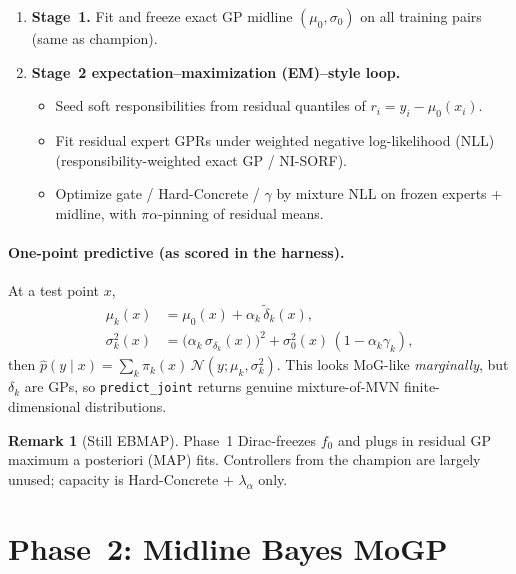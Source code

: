 \documentclass[11pt,a4paper]{article}
\newcommand{\Ncal}{\mathcal{N}}
\theoremstyle{definition}
\newtheorem{remark}{Remark}
\begin{document}
\begin{enumerate}[leftmargin=1.4em]
\item \textbf{Stage~1.} Fit and freeze exact GP midline $(\mu_0,\sigma_0)$ on all
  training pairs (same as champion).
\item \textbf{Stage~2 expectation--maximization (EM)--style loop.}
  \begin{itemize}[itemsep=1pt]
  \item Seed soft responsibilities from residual quantiles of
    $r_i=y_i-\mu_0(x_i)$.
  \item Fit residual expert GPRs under weighted negative log-likelihood (NLL)
    (responsibility-weighted exact GP / NI-SORF).
  \item Optimize gate / Hard-Concrete / $\gamma$ by mixture NLL on
    frozen experts + midline, with $\pi\alpha$-pinning of residual means.
  \end{itemize}
\end{enumerate}

\paragraph{One-point predictive (as scored in the harness).}
At a test point $x$,
\begin{align}
  \mu_k(x)
  &=
  \mu_0(x)+\alpha_k\,\tilde\delta_k(x),\\
  \sigma_k^2(x)
  &=
  \bigl(\alpha_k\,\sigma_{\delta_k}(x)\bigr)^2
  +
  \sigma_0^2(x)\,(1-\alpha_k\gamma_k),
\end{align}
then $\hat p(y\mid x)=\sum_k \pi_k(x)\,\Ncal(y;\mu_k,\sigma_k^2)$.
This looks MoG-like \emph{marginally}, but $\delta_k$ are GPs, so
\texttt{predict\_joint} returns genuine mixture-of-MVN finite-dimensional
distributions.

\begin{remark}[Still EBMAP]
Phase~1 Dirac-freezes $f_0$ and plugs in residual GP maximum a posteriori (MAP)
fits. Controllers from the champion are largely unused; capacity is Hard-Concrete
$+$ $\lambda_\alpha$ only.
\end{remark}

\section{Phase~2: Midline Bayes MoGP}
\label{sec:bayes}
\end{document}
